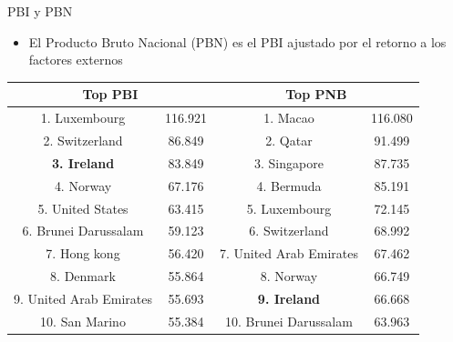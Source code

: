 \documentclass{beamer}
\begin{document}
\begin{frame}{PBI y PBN}
    \begin{itemize}
        \item El Producto Bruto Nacional (PBN) es el PBI ajustado por el retorno a los factores externos
    \end{itemize}
    \begin{table}
    \small
\begin{tabular}{|c|c|c|c|} 
\hline 
\multicolumn{2}{|c|}{\textbf{Top PBI}} & \multicolumn{2}{c|}{\textbf{Top PNB}} \\ \hline
1. Luxembourg              & 116.921   & 1.  Macao                  & 116.080  \\ \hline
2.  Switzerland            & 86.849    & 2. Qatar                   & 91.499   \\ \hline
\textbf{3. Ireland}        & 83.849    & 3.  Singapore              & 87.735   \\ \hline
4. Norway                  & 67.176    & 4. Bermuda                 & 85.191   \\ \hline
5. United States           & 63.415    & 5. Luxembourg              & 72.145   \\ \hline
6. Brunei Darussalam       & 59.123    & 6. Switzerland             & 68.992   \\ \hline
7. Hong kong               & 56.420    & 7.  United Arab Emirates   & 67.462   \\ \hline
8. Denmark                 & 55.864    & 8. Norway                  & 66.749   \\ \hline
9. United Arab Emirates    & 55.693    & \textbf{9. Ireland}        & 66.668   \\ \hline
10. San Marino             & 55.384    & 10. Brunei Darussalam      & 63.963   \\ \hline
\end{tabular}
\end{table}
\end{frame}
\end{document}
